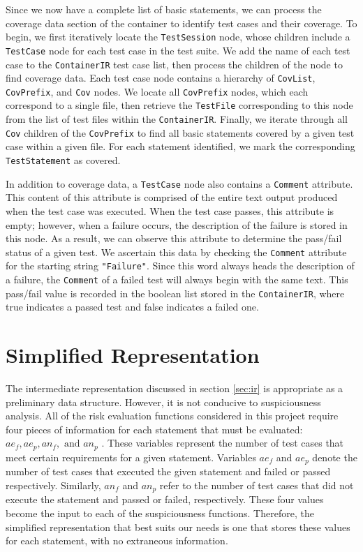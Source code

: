 Since we now have a complete list of basic statements, we can process the coverage data section
of the container to identify test cases and their coverage.  To begin, we first iteratively 
locate the \texttt{TestSession} node, whose children include a \texttt{TestCase} node for
each test case in the test suite.  We add the name of each test case to the \texttt{ContainerIR}
test case list, then process the children of the node to find coverage data.  Each test case
node contains a hierarchy of \texttt{CovList}, \texttt{CovPrefix}, and \texttt{Cov} nodes.  We 
locate all \texttt{CovPrefix} nodes, which each correspond to a single file, then retrieve the
\texttt{TestFile} corresponding to this node from the list of test files within the \texttt{ContainerIR}.
Finally, we iterate through all \texttt{Cov} children of the \texttt{CovPrefix} to find all 
basic statements covered by a given test case within a given file.  For each statement identified,
we mark the corresponding \texttt{TestStatement} as covered.

In addition to coverage data, a \texttt{TestCase} node also contains a \texttt{Comment} attribute.
This content of this attribute is comprised of the entire text output produced when the test case
was executed.  When the test case passes, this attribute is empty; however, when a failure occurs,
the description of the failure is stored in this node.  As a result, we can observe this attribute
to determine the pass/fail status of a given test.  We ascertain this data by checking the
\texttt{Comment} attribute for the starting string \texttt{"Failure"}.  Since this word always
heads the description of a failure, the \texttt{Comment} of a failed test will always begin with
the same text.  This pass/fail value is recorded in the boolean list stored in the 
\texttt{ContainerIR}, where true indicates a passed test and false indicates a failed one.  

\section{Simplified Representation} \label{sec:sir}

The intermediate representation discussed in section \ref{sec:ir} is appropriate as a preliminary
data structure.  However, it is not conducive to suspiciousness analysis.  All of the risk evaluation
functions considered in this project require four pieces of information for each statement that
must be evaluated: $ae_f, ae_p, an_f, \text{ and } an_p$ \cite{theory}.  These variables represent the number
of test cases that meet certain requirements for a given statement.  Variables $ae_f$ and $ae_p$
denote the number of test cases that executed the given statement and failed or passed
respectively. Similarly, $an_f$ and $an_p$ refer to the number of test cases that did not execute
the statement and passed or failed, respectively.  These four values become the input to each of
the suspiciousness functions.  Therefore, the simplified representation that best suits our needs
is one that stores these values for each statement, with no extraneous information.

